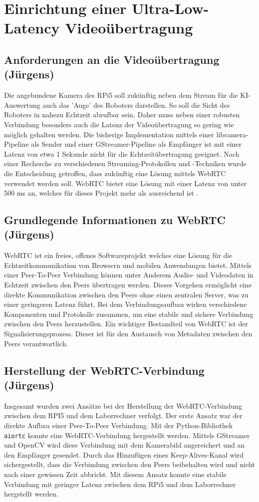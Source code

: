 \chapter{Einrichtung einer Ultra-Low-Latency Videoübertragung \label{sec:webrtc}}
\section{Anforderungen an die Videoübertragung (Jürgens)}
Die angebundene Kamera des RPi5 soll zukünftig neben dem Stream für die KI-Auswertung auch das 'Auge' des Roboters darstellen. So soll die Sicht des Roboters in nahezu Echtzeit abrufbar sein. Daher muss neben einer robusten Verbindung besonders auch die Latenz der Videoübertragung so gering wie möglich gehalten werden. Die bisherige Implementation mittels einer libcamera-Pipeline als Sender und einer GStreamer-Pipeline als Empfänger ist mit einer Latenz von etwa 1 Sekunde nicht für die Echtzeitübertragung geeignet. Nach einer Recherche zu verschiedenen Streaming-Protokollen und -Techniken wurde die Entscheidung getroffen, dass zukünftig eine Lösung mittels WebRTC verwendet werden soll. WebRTC bietet eine Lösung mit einer Latenz von unter 500 ms an, welches für dieses Projekt mehr als ausreichend ist \cite{WebRTCLatency}.

\section{Grundlegende Informationen zu WebRTC (Jürgens)}
WebRTC ist ein freies, offenes Softwareprojekt welches eine Lösung für die Echtzeitkommunikation von Browsern und mobilen Anwendungen bietet. Mittels einer Peer-To-Peer Verbindung können unter Anderem Audio- und Videodaten in Echtzeit zwischen den Peers übertragen werden. Dieses Vorgehen ermöglicht eine direkte Kommunikation zwischen den Peers ohne einen zentralen Server, was zu einer geringeren Latenz führt.
Bei dem Verbindungsaufbau wirken verschiedene Komponenten und Protokolle zusammen, um eine stabile und sichere Verbindung zwischen den Peers herzustellen. Ein wichtiger Bestandteil von WebRTC ist der Signalisierungsprozess. Dieser ist für den Austausch von Metadaten zwischen den Peers verantwortlich. \cite{WebRTCBasics}

\section{Herstellung der WebRTC-Verbindung (Jürgens)}
Insgesamt wurden zwei Ansätze bei der Herstellung der WebRTC-Verbindung zwischen dem RPI5 und dem Laborrechner verfolgt. Der erste Ansatz war der direkte Aufbau einer Peer-To-Peer Verbindung.
Mit der Python-Bibliothek \texttt{aiortc} konnte eine WebRTC-Verbindung hergestellt werden. Mittels GStreamer und OpenCV wird diese Verbindung mit dem Kamerabild angereichert und an den Empfänger gesendet. Durch das Hinzufügen eines Keep-Alives-Kanal wird sichergestellt, dass die Verbindung zwischen den Peers beibehalten wird und nicht nach einer gewissen Zeit abbricht. Mit diesem Ansatz konnte eine stabile Verbindung mit geringer Latenz zwischen dem RPi5 und dem Laborrechner hergstellt werden.

